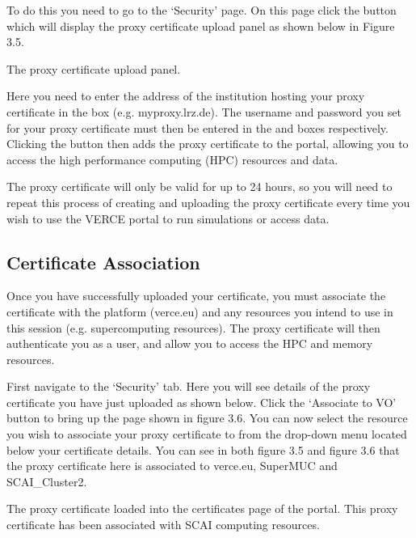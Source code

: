 \documentclass[english]{book}
\begin{document}
To do this you need to go to the ‘Security’ page. On this page click the
 button which will display the proxy certificate upload panel as
shown below in Figure 3.5.


 The proxy certificate upload panel.

Here you need to enter the address of the institution hosting your proxy
certificate in the  box (e.g. myproxy.lrz.de). The
username and password you set for your proxy certificate must then be
entered in the  and  boxes respectively.
Clicking the button then adds the proxy certificate to the
portal, allowing you to access the high performance computing (HPC)
resources and data.

The proxy certificate will only be valid for up to 24 hours, so you will
need to repeat this process of creating and uploading the proxy
certificate every time you wish to use the VERCE portal to run
simulations or access data.


\subsection{Certificate Association}
\label{\detokenize{Section3:certificate-association}}
Once you have successfully uploaded your certificate, you must associate
the certificate with the platform (verce.eu) and any resources you
intend to use in this session (e.g. supercomputing resources). The proxy
certificate will then authenticate you as a user, and allow you to
access the HPC and memory resources.

First navigate to the ‘Security’ tab. Here you will see details of the
proxy certificate you have just uploaded as shown below. Click the
‘Associate to VO’ button to bring up the page shown in figure 3.6. You
can now select the resource you wish to associate your proxy certificate
to from the drop-down menu located below your certificate details. You
can see in both figure 3.5 and figure 3.6 that the proxy certificate
here is associated to verce.eu, SuperMUC and SCAI\_Cluster2.


 The proxy certificate loaded into the certificates page
of the portal. This proxy certificate has been associated with SCAI computing resources.
\end{document}

